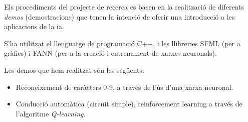 Els procediments del projecte de recerca es basen en la realització de diferents \emph{demos} (demostracions)
que tenen la intenció de oferir una introducció a les aplicacions de la \ac{ia}.

S'ha utilitzat el llenguatge de programació C++, i les llibreries SFML \autocite{sfmllib} (per a gràfics) i FANN \cite{fannlib} (per a la
creació i entrenament de xarxes neuronals).

Les demos que hem realitzat són les següents:

\begin{itemize}
\item Reconeixement de caràcters 0-9, a través de l'ús d'una xarxa neuronal.
\item Conducció automàtica (circuit simple), reinforcement learning a través de l'algoritme \emph{Q-learning}.
\end{itemize}
